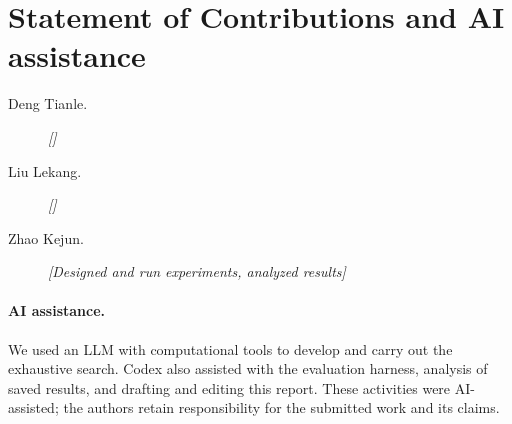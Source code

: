 \documentclass[11pt,letterpaper,titlepage]{article}
\begin{document}
\section{Statement of Contributions and AI assistance}
\label{sec:contributions}

\begin{description}
\item[Deng Tianle.] \textit{[]}
\item[Liu Lekang.] \textit{[]}
\item[Zhao Kejun.] \textit{[Designed and run experiments, analyzed results]}
\end{description}

\paragraph{AI assistance.}
We used an LLM with computational tools to develop and carry out the exhaustive search. Codex also assisted with the evaluation harness, analysis of saved results, and drafting and editing this report. These activities were AI-assisted; the authors retain responsibility for the submitted work and its claims.
\end{document}
